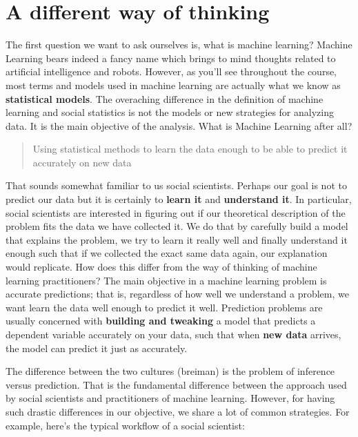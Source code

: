 \documentclass[
]{book}
\begin{document}
\hypertarget{a-different-way-of-thinking}{%
\section{A different way of thinking}\label{a-different-way-of-thinking}}

The first question we want to ask ourselves is, what is machine learning? Machine Learning bears indeed a fancy name which brings to mind thoughts related to artificial intelligence and robots. However, as you'll see throughout the course, most terms and models used in machine learning are actually what we know as \textbf{statistical models}. The overaching difference in the definition of machine learning and social statistics is not the models or new strategies for analyzing data. It is the main objective of the analysis. What is Machine Learning after all?

\begin{quote}
Using statistical methods to learn the data enough to be able to predict it accurately on new data
\end{quote}

That sounds somewhat familiar to us social scientists. Perhaps our goal is not to predict our data but it is certainly to \textbf{learn it} and \textbf{understand it}. In particular, social scientists are interested in figuring out if our theoretical description of the problem fits the data we have collected it. We do that by carefully build a model that explains the problem, we try to learn it really well and finally understand it enough such that if we collected the exact same data again, our explanation would replicate. How does this differ from the way of thinking of machine learning practitioners? The main objective in a machine learning problem is accurate predictions; that is, regardless of how well we understand a problem, we want learn the data well enough to predict it well. Prediction problems are usually concerned with \textbf{building and tweaking} a model that predicts a dependent variable accurately on your data, such that when \textbf{new data} arrives, the model can predict it just as accurately.

The difference between the two cultures (breiman) is the problem of inference versus prediction. That is the fundamental difference between the approach used by social scientists and practitioners of machine learning. However, for having such drastic differences in our objective, we share a lot of common strategies. For example, here's the typical workflow of a social scientist:
\end{document}
